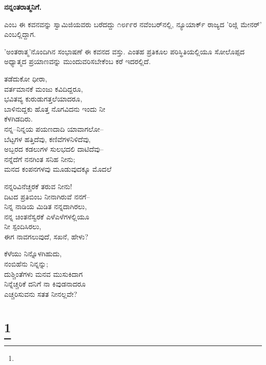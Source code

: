 \begin{center}
\textbf{ನನ್ನಂತರಾತ್ಮನಿಗೆ.}
\end{center}

 ಎಂಬ ಈ ಕವನವನ್ನು ಸ್ವಾಮಿಜಿಯವರು ಬರೆದದ್ದು ೧೮೯೯ರ ನವೆಂಬರ್‌ನಲ್ಲಿ, ನ್ಯೂಯಾರ್ಕ್ ರಾಜ್ಯದ 'ರಿಜ್ಲಿ ಮೇನರ್' ಎಂಬಲ್ಲಿದ್ದಾಗ.

'ಅಂತರಾತ್ಮ'ನೊಂದಿಗಿನ ಸಂಭಾಷಣೆ ಈ ಕವನದ ವಸ್ತು. ಎಂತಹ ಪ್ರತಿಕೂಲ ಪರಿಸ್ಥಿತಿಯಲ್ಲಿಯೂ ಸೋಲೊಪ್ಪದ ಅಧ್ಯಾತ್ಮದ ಪ್ರಯಾಣವನ್ನು ಮುಂದುವರಿಸಬೇಕೆಂಬ ಕರೆ ಇದರಲ್ಲಿದೆ.

\begin{myquote}
ತಡೆದುಕೋ ಧೀರಾ,\\ವರ್ತಮಾನಕೆ ಮಂಜು ಕವಿದಿದ್ದರೂ,\\ಭವಿತವ್ಯ ಕುರುಡುಗತ್ತಲೆಯಾದರೂ,\\ಬಾಳಿನುದ್ದಕು ಹೊತ್ತ ನೊಗವಿದನು ಇಂದು ನೀ\\ಕೆಳಗಿಡದಿರು.\\ನನ್ನ–ನಿನ್ನಯ ಪಯಣದಾದಿ ಯಾವಾಗಲೋ–\\ಬೆಟ್ಟಗಳ ಹತ್ತಿದೆವು, ಕಣಿವೆಗಳನಿಳಿದೆವು,\\ಅಬ್ಬರದ ಕಡಲುಗಳ ಸುಲಭದಲಿ ದಾಟಿದೆವು–\\ನನ್ನೆದೆಗೆ ನನಗಿಂತ ಸನಿಹ ನೀನು;\\ಮನದ ಕಂಪನಗಳವು ಮೂಡುವುದಕ್ಕೂ ಮೊದಲೆ
\end{myquote}

\begin{myquote}
ನನ್ನರಿವಿನೆಚ್ಚರಕೆ ತರುವ ನೀನು!\\ದಿಟದ ಪ್ರತಿಬಿಂಬ ನೀನಾಗಿರುವೆ ನನಗೆ–\\ನಿನ್ನ ನಾಡಿಯ ಮಿಡಿತ ನನ್ನದಾಗಿರಲು,\\ನನ್ನ ಚಿಂತನೆಸ್ವರಕೆ ಎಳೆಎಳೆಗಳಲ್ಲಿಯೂ\\ನೀ ಸ್ಪಂದಿಸಿರಲು,\\ಈಗ ನಾವಗಲುವುದೆ, ಸಖನೆ, ಹೇಳು?
\end{myquote}

\begin{myquote}
ಕೆಳೆಯು ನಿನ್ನೊಳಗಿಹುದು,\\ನಂಬಿಹೆನು ನಿನ್ನನ್ನು;\\ದುಶ್ಚಿಂತೆಗಳು ಮನವ ಮುಸುಕಿದಾಗ\\ನಿನ್ನೆಚ್ಚರಿಕೆ ದನಿಗೆ ನಾ ಕಿವುಡನಾದರೂ\\ಎಚ್ಚರಿಸುವನು ಸತತ ನೀನಲ್ಲವೇ?
\end{myquote}

\selecteng

\chapter[NO ONE TO BLAME]{\protect\footnote{}}

